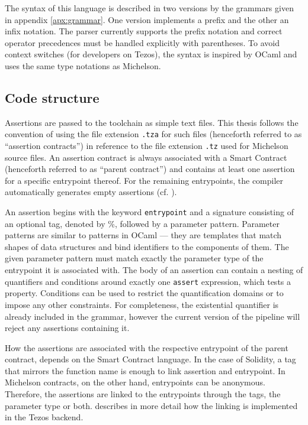 The syntax of this language is described in two versions by the grammars given in appendix \ref{apx:grammar}. One version implements a prefix and the other an infix notation. The parser currently supports the prefix notation and correct operator precedences must be handled explicitly with parentheses. To avoid context switches (for developers on Tezos), the syntax is inspired by OCaml and uses the same type notations as Michelson.

\subsection{Code structure}
Assertions are passed to the toolchain as simple text files. This thesis follows the convention of using the file extension \texttt{.tza} for such files (henceforth referred to as ``assertion contracts'') in reference to the file extension \texttt{.tz} used for Michelson source files. An assertion contract is always associated with a Smart Contract (henceforth referred to as ``parent contract'') and contains at least one assertion for a specific entrypoint thereof. For the remaining entrypoints, the compiler automatically generates empty assertions (cf. ).

An assertion begins with the keyword \texttt{entrypoint} and a signature consisting of an optional tag, denoted by \%, followed by a parameter pattern. Parameter patterns are similar to patterns in OCaml --- they are templates that match shapes of data structures and bind identifiers to the components of them. The given parameter pattern must match exactly the parameter type of the entrypoint it is associated with. The body of an assertion can contain a nesting of quantifiers and conditions around exactly one \texttt{assert} expression, which tests a property. Conditions can be used to restrict the quantification domains or to impose any other constraints. For completeness, the existential quantifier is already included in the grammar, however the current version of the pipeline will reject any assertions containing it. 

How the assertions are associated with the respective entrypoint of the parent contract, depends on the Smart Contract language. In the case of Solidity, a tag that mirrors the function name is enough to link assertion and entrypoint. In Michelson contracts, on the other hand, entrypoints can be anonymous. Therefore, the assertions are linked to the entrypoints through the tags, the parameter type or both.  describes in more detail how the linking is implemented in the Tezos backend.

